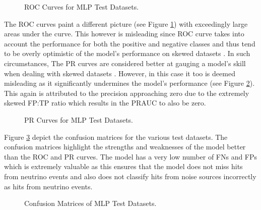 \begin{figure}[htb]
  \centering
  \caption{ROC Curves for MLP Test Datasets.}
  \label{fig:mlp-roc}
\end{figure}

The ROC curves paint a different picture (see Figure
\ref{fig:mlp-roc}) with exceedingly large areas under the curve. This
however is misleading since ROC curve takes into account the
performance for both the positive and negative classes and thus tend
to be overly optimistic of the model's performance on skewed datasets
\cite{branco2015survey,fernandez2018learning}. In such circumstances,
The PR curves are considered better at gauging a model's skill when
dealing with skewed datasets \cite{branco2015survey}. However, in this
case it too is deemed misleading as it significantly undermines the
model's performance (see Figure \ref{fig:mlp-pr}). This again is
attributed to the precision approaching zero due to the extremely
skewed FP:TP ratio which results in the PRAUC to also be zero.

\begin{figure}[htb]
  \centering
  \caption{PR Curves for MLP Test Datasets.}
  \label{fig:mlp-pr}
\end{figure}

Figure \ref{fig:mlp-cm} depict the confusion matrices for the various
test datasets. The confusion matrices highlight the strengths and
weaknesses of the model better than the ROC and PR curves. The model
has a very low number of FNs and FPs which is extremely valuable as
this ensures that the model does not miss hits from neutrino events
and also does not classify hits from noise sources incorrectly as hits
from neutrino events.

\begin{figure}[htb]
  \centering

  \caption{Confusion Matrices of MLP Test Datasets.}
  \label{fig:mlp-cm}
\end{figure}

